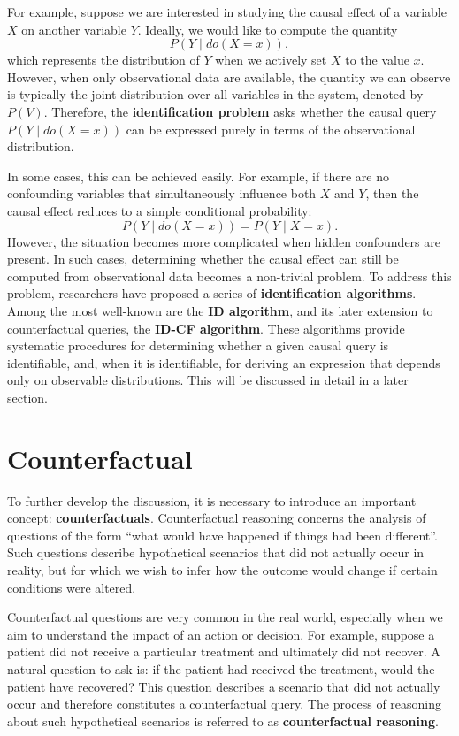 \documentclass[a4paper]{report}
\begin{document}
For example, suppose we are interested in studying the causal effect of a variable $X$ on another variable $Y$. 
Ideally, we would like to compute the quantity
\[
P(Y \mid do(X = x)),
\]
which represents the distribution of $Y$ when we actively set $X$ to the value $x$. 
However, when only observational data are available, the quantity we can observe is typically the joint distribution over all variables in the system, denoted by $P(V)$. 
Therefore, the \textbf{identification problem} asks whether the causal query $P(Y \mid do(X = x))$ can be expressed purely in terms of the observational distribution.

In some cases, this can be achieved easily. 
For example, if there are no confounding variables that simultaneously influence both $X$ and $Y$, then the causal effect reduces to a simple conditional probability:
\[
P(Y \mid do(X = x)) = P(Y \mid X = x).
\]
However, the situation becomes more complicated when hidden confounders are present. In such cases, determining whether the causal effect can still be computed from observational data becomes a non-trivial problem. To address this problem, researchers have proposed a series of \textbf{identification algorithms}. Among the most well-known are the \textbf{ID algorithm}\cite{pearl2009causality}, and its later extension to counterfactual queries, the \textbf{ID-CF algorithm}\cite{shpitser2008complete}. These algorithms provide systematic procedures for determining whether a given causal query is identifiable, and, when it is identifiable, for deriving an expression that depends only on observable distributions. This will be discussed in detail in a later section.

\section{Counterfactual}
To further develop the discussion, it is necessary to introduce an important concept: \textbf{counterfactuals}. Counterfactual reasoning concerns the analysis of questions of the form “what would have happened if things had been different”. Such questions describe hypothetical scenarios that did not actually occur in reality, but for which we wish to infer how the outcome would change if certain conditions were altered.\cite{pearl2009causality, shpitser2007counterfactuals}

Counterfactual questions are very common in the real world, especially when we aim to understand the impact of an action or decision. For example, suppose a patient did not receive a particular treatment and ultimately did not recover. A natural question to ask is: if the patient had received the treatment, would the patient have recovered? This question describes a scenario that did not actually occur and therefore constitutes a counterfactual query. The process of reasoning about such hypothetical scenarios is referred to as \textbf{counterfactual reasoning}.
\end{document}
